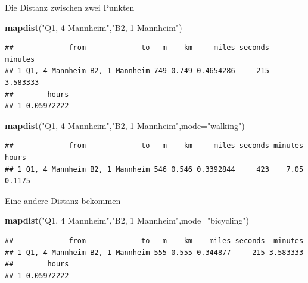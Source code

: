 \documentclass[ignorenonframetext,]{beamer}
\newenvironment{Shaded}{}{}
\newcommand{\KeywordTok}[1]{\textcolor[rgb]{0.00,0.44,0.13}{\textbf{{#1}}}}
\newcommand{\DataTypeTok}[1]{\textcolor[rgb]{0.56,0.13,0.00}{{#1}}}
\newcommand{\StringTok}[1]{\textcolor[rgb]{0.25,0.44,0.63}{{#1}}}
\newcommand{\NormalTok}[1]{{#1}}
\begin{document}
\begin{frame}[fragile]{Die Distanz zwischen zwei Punkten}

\begin{Shaded}
\begin{Highlighting}[]
\KeywordTok{mapdist}\NormalTok{(}\StringTok{"Q1, 4 Mannheim"}\NormalTok{,}\StringTok{"B2, 1 Mannheim"}\NormalTok{)}
\end{Highlighting}
\end{Shaded}

\begin{verbatim}
##             from             to   m    km     miles seconds  minutes
## 1 Q1, 4 Mannheim B2, 1 Mannheim 749 0.749 0.4654286     215 3.583333
##        hours
## 1 0.05972222
\end{verbatim}

\begin{Shaded}
\begin{Highlighting}[]
\KeywordTok{mapdist}\NormalTok{(}\StringTok{"Q1, 4 Mannheim"}\NormalTok{,}\StringTok{"B2, 1 Mannheim"}\NormalTok{,}\DataTypeTok{mode=}\StringTok{"walking"}\NormalTok{)}
\end{Highlighting}
\end{Shaded}

\begin{verbatim}
##             from             to   m    km     miles seconds minutes  hours
## 1 Q1, 4 Mannheim B2, 1 Mannheim 546 0.546 0.3392844     423    7.05 0.1175
\end{verbatim}

\end{frame}

\begin{frame}[fragile]{Eine andere Distanz bekommen}

\begin{Shaded}
\begin{Highlighting}[]
\KeywordTok{mapdist}\NormalTok{(}\StringTok{"Q1, 4 Mannheim"}\NormalTok{,}\StringTok{"B2, 1 Mannheim"}\NormalTok{,}\DataTypeTok{mode=}\StringTok{"bicycling"}\NormalTok{)}
\end{Highlighting}
\end{Shaded}

\begin{verbatim}
##             from             to   m    km    miles seconds  minutes
## 1 Q1, 4 Mannheim B2, 1 Mannheim 555 0.555 0.344877     215 3.583333
##        hours
## 1 0.05972222
\end{verbatim}

\end{frame}
\end{document}
